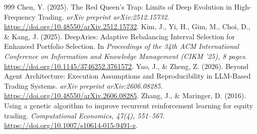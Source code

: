\documentclass[11pt,a4paper]{article}
\begin{document}
\begin{thebibliography}{999}
 Chen, Y. (2025). The Red Queen's Trap: Limits of Deep Evolution in High-Frequency Trading. \emph{arXiv preprint arXiv:2512.15732}. \url{https://doi.org/10.48550/arXiv.2512.15732}.
 Kim, J., Yi, H., Gim, M., Choi, D., \& Kang, J. (2025). DeepAries: Adaptive Rebalancing Interval Selection for Enhanced Portfolio Selection. In \emph{Proceedings of the 34th ACM International Conference on Information and Knowledge Management (CIKM '25), 8 pages}. \url{https://doi.org/10.1145/3746252.3761572}.
 Yao, J., \& Zheng, Z. (2026). Beyond Agent Architecture: Execution Assumptions and Reproducibility in LLM-Based Trading Systems. \emph{arXiv preprint arXiv:2606.08285}. \url{https://doi.org/10.48550/arXiv.2606.08285}.
 Zhang, J., \& Maringer, D. (2016). Using a genetic algorithm to improve recurrent reinforcement learning for equity trading. \emph{Computational Economics, 47(4), 551--567}. \url{https://doi.org/10.1007/s10614-015-9491-z}.
\end{thebibliography}
\end{document}
